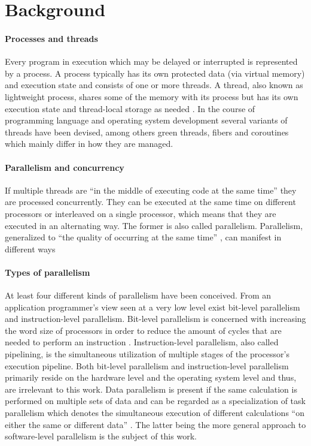 \chapter{Background}

\subsubsection{Processes and threads}
Every program in execution which may be delayed or interrupted is represented by a process. A process typically has its own protected data (via virtual memory) and execution state and consists of one or more threads. A thread, also known as lightweight process, shares some of the memory with its process but has its own execution state and thread-local storage as needed \cite[p.~20]{PrinciplesOfModernOSs}. In the course of programming language and operating system development several variants of threads have been devised, among others green threads, fibers and coroutines which mainly differ in how they are managed.

\subsubsection{Parallelism and concurrency}
If multiple threads are ``in the middle of executing code at the same time''\cite[p.~124(?)]{MultiProgWithJavaTech} they are processed concurrently. They can be executed at the same time on different processors or interleaved on a single processor, which means that they are executed in an alternating way. The former is also called parallelism. Parallelism, generalized to ``the quality of occurring at the same time'' \cite[p.~91]{OSs_AConceptBasedApproach}, can manifest in different ways %

\subsubsection{Types of parallelism}
At least four different kinds of parallelism have been conceived. From an application programmer's view seen at a very low level exist bit-level parallelism and instruction-level parallelism. Bit-level parallelism is concerned with increasing the word size of processors in order to reduce the amount of cycles that are needed to perform an instruction \cite[p.~15]{ParCompArchitecture_HW/SW_Approach}. Instruction-level parallelism, also called pipelining, is the simultaneous utilization of multiple stages of the processor's execution pipeline. Both bit-level parallelism and instruction-level parallelism primarily reside on the hardware level and the operating system level and thus, are irrelevant to this work. Data parallelism is present if the same calculation is performed on multiple sets of data and can be regarded as a specialization of task parallelism which denotes the simultaneous execution of different calculations ``on either the same or different data'' \cite[p.~125]{ParCompArchitecture_HW/SW_Approach}. The latter being the more general approach to software-level parallelism is the subject of this work.

